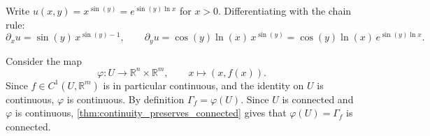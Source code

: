 \begin{exercisesolution}
Write $u(x,y) = x^{\sin(y)} = e^{\sin(y)\ln x}$ for $x > 0$. Differentiating with the chain rule:
\[
\partial_x u = \sin(y)\,x^{\sin(y)-1}, \qquad \partial_y u = \cos(y)\ln(x)\,x^{\sin(y)} = \cos(y)\ln(x)\,e^{\sin(y)\ln x}.
\]
\end{exercisesolution}

\begin{exercisesolution}
Consider the map
\[
\varphi : U \to \mathbb{R}^n \times \mathbb{R}^m, \qquad x \mapsto (x, f(x)).
\]
Since $f \in C^1(U,\mathbb{R}^m)$ is in particular continuous, and the identity on $U$ is
continuous, $\varphi$ is continuous. By definition $\Gamma_f = \varphi(U)$. Since $U$ is connected
and $\varphi$ is continuous, \cref{thm:continuity_preserves_connected} gives that $\varphi(U) =
\Gamma_f$ is connected.
\end{exercisesolution}

